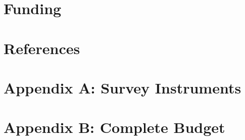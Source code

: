 \documentclass[12pt]{article}
\begin{document}
\section{Funding}


\newpage
\section{References}




\newpage
\section{Appendix A: Survey Instruments}




\section{Appendix B: Complete Budget}
\end{document}

